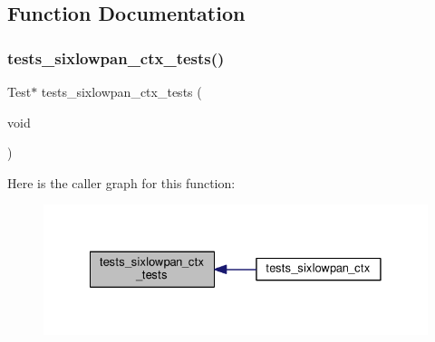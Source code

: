 \subsection{Function Documentation}
\mbox{\label{tests-sixlowpan__ctx_8c_a968c464332df2177e1f80e679648ebf9}} 
\subsubsection{\texorpdfstring{tests\+\_\+sixlowpan\+\_\+ctx\+\_\+tests()}{tests\_sixlowpan\_ctx\_tests()}}
{\footnotesize\ttfamily Test$\ast$ tests\+\_\+sixlowpan\+\_\+ctx\+\_\+tests (\begin{DoxyParamCaption}\item[{void}]{ }\end{DoxyParamCaption})}

Here is the caller graph for this function\+:
\nopagebreak
\begin{figure}[H]
\begin{center}
\leavevmode
\includegraphics[width=328pt]{tests-sixlowpan__ctx_8c_a968c464332df2177e1f80e679648ebf9_icgraph}
\end{center}
\end{figure}
